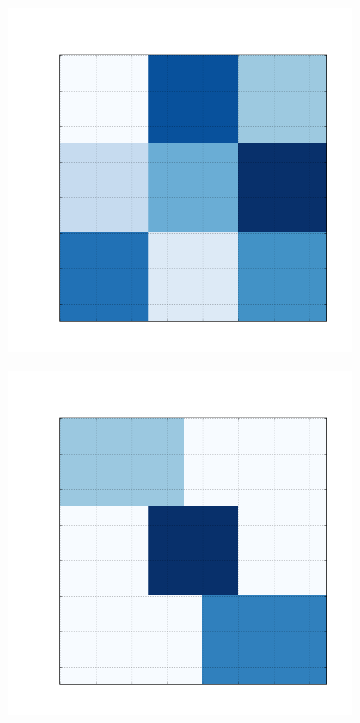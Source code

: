 \documentclass[
    12pt,                %
    oneside,            %
    a4paper,            %
    english,            %
    brazil                %
    ]{abntex2ppgsi}
\begin{document}
\begin{figure}[H]
\begin{subfigure}[b]{0.18\textwidth}
        \caption{}
    \end{subfigure}
    \begin{subfigure}[b]{0.18\textwidth}
        \includegraphics[width=\textwidth]{img/c-reconstruction-binovnmtf.png}
        \caption{}
    \end{subfigure}
    \begin{subfigure}[b]{0.18\textwidth}
        \includegraphics[width=\textwidth]{img/d-reconstruction-binovnmtf.png}

\end{subfigure}
\end{figure}
\end{document}
